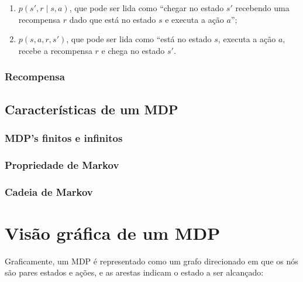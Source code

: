 \documentclass{article}
\begin{document}
                \begin{enumerate}
                    \item $p(s', r \mid s, a)$, que pode ser lida como ``chegar no estado $s'$ recebendo uma recompensa $r$ dado que está no estado $s$ e executa a ação $a$'';
                    \item $p(s, a, r, s')$, que pode ser lida como ``está no estado $s$, executa a ação $a$, recebe a recompensa $r$ e chega no estado $s'$.
                \end{enumerate}
                
            \subsubsection{Recompensa}
        
        
        \subsection{Características de um MDP}
        
            \subsubsection{MDP's finitos e infinitos}
            
            \subsubsection{Propriedade de Markov}
            
            \subsubsection{Cadeia de Markov}
        
    \section{Visão gráfica de um MDP}
    
        Graficamente, um MDP é representado como um grafo direcionado em que os nós são pares estados e ações, e as arestas indicam o estado a ser alcançado:
    
\end{document}
